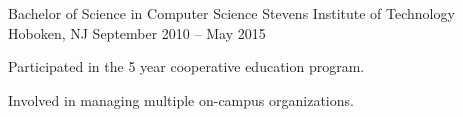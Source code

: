 

\begin{cventries}

  \cventry
    {Bachelor of Science in Computer Science} %
    {Stevens Institute of Technology} %
    {Hoboken, NJ} %
    {September 2010 – May 2015} %
    {
      \begin{cvitems} %
        \item {Participated in the 5 year cooperative education program.}
        \item {Involved in managing multiple on-campus organizations.}
      \end{cvitems}
    }

\end{cventries}
